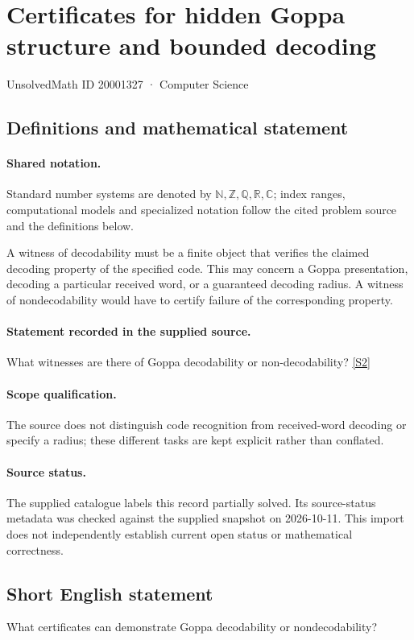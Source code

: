 \documentclass[11pt]{article}
\newcommand{\sref}[2]{\hyperlink{source:#1:#2}{[S#2]}}
\begin{document}
\setcounter{section}{20001326}
\section{Certificates for hidden Goppa structure and bounded decoding}\label{20001327}
{\small\sffamily UnsolvedMath ID 20001327 · Computer Science}
\subsection{Definitions and mathematical statement}

\paragraph{Shared notation.}Standard number systems are denoted by $\mathbb N,\mathbb Z,\mathbb Q,\mathbb R,\mathbb C$; index ranges, computational models and specialized notation follow the cited problem source and the definitions below.


A witness of decodability must be a finite object that verifies the claimed decoding property of the specified code. This may concern a Goppa presentation, decoding a particular received word, or a guaranteed decoding radius. A witness of nondecodability would have to certify failure of the corresponding property.
\paragraph{Statement recorded in the supplied source.}
What witnesses are there of Goppa decodability or non-decodability? \sref{20001327}{2}
\paragraph{Scope qualification.}
The source does not distinguish code recognition from received-word decoding or specify a radius; these different tasks are kept explicit rather than conflated.
\paragraph{Source status.}
The supplied catalogue labels this record partially solved. Its source-status metadata was checked against the supplied snapshot on 2026-10-11. This import does not independently establish current open status or mathematical correctness.
\subsection{Short English statement}
What certificates can demonstrate Goppa decodability or nondecodability?
\end{document}
